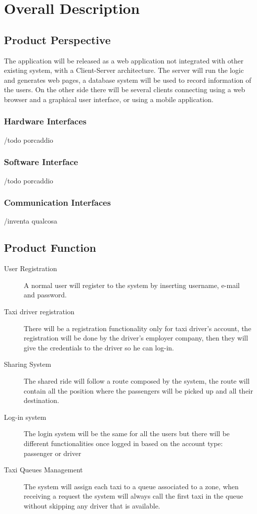 \section{Overall Description}

\subsection{Product Perspective}
	The application will be released as a web application not integrated with other existing system, with a Client-Server architecture. The server will run the logic and generates web pages, a database system will be used to record information of the users. On the other side there will be several clients connecting using a web browser and a graphical user interface, or using a mobile application.	
	
	\subsubsection{Hardware Interfaces}
	/todo porcaddio
	\subsubsection{Software Interface}
	/todo porcaddio
	\subsubsection{Communication Interfaces}
	/inventa qualcosa
		
\subsection{Product Function}
	\begin{description}
		\item [User Registration] A normal user will register to the system by inserting username, e-mail and password.
		\item [Taxi driver registration] There will be a registration functionality only for taxi driver's account, the registration will be done by the driver's employer company, then they will give the credentials to the driver so he can log-in.
		\item [Sharing System] The shared ride will follow a route composed by the system, the route will contain all the position where the passengers will be picked up and all their destination.
		\item [Log-in system] The login system will be the same for all the users but there will be different functionalities once logged in based on the account type: passenger or driver
		\item [Taxi Queues Management] The system will assign each taxi to a queue associated to a zone, when receiving a request the system will always call the first taxi in the queue without skipping any driver that is available.
	\end{description}
	
